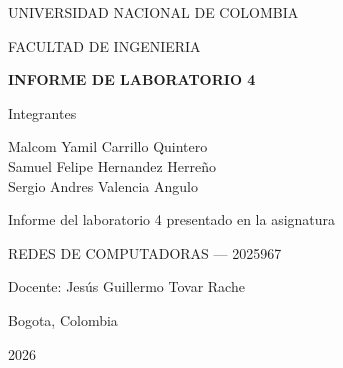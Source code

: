 

\begin{titlepage}
\centering

\vspace*{4cm}

{\large
UNIVERSIDAD NACIONAL DE COLOMBIA
}

\vspace{1cm}

{\large
FACULTAD DE INGENIERIA
}

\vspace{3cm}

{\Large
\textbf{INFORME DE LABORATORIO 4}
}

\vspace{3cm}

{\large
Integrantes
}

\vspace{0.5cm}

{\large
Malcom Yamil Carrillo Quintero \\
Samuel Felipe Hernandez Herreño \\
Sergio Andres Valencia Angulo
}

\vspace{3cm}

{\large
Informe del laboratorio 4 presentado en la asignatura
}

\vspace{0.5cm}

{\large
REDES DE COMPUTADORAS — 2025967
}

\vspace{0.5cm}

{\large
Docente: Jesús Guillermo Tovar Rache
}

\vfill

{\large
Bogota, Colombia
}

\vspace{0.3cm}

{\large
2026
}

\end{titlepage}
